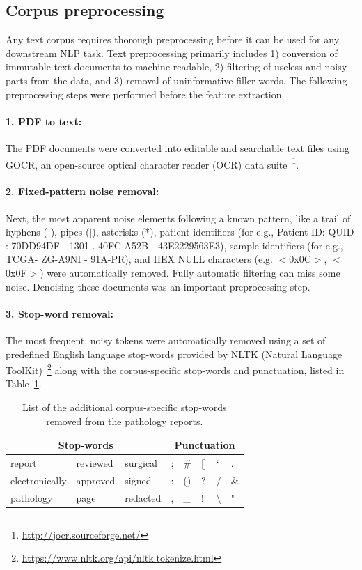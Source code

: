 \documentclass[runningheads]{llncs}
\begin{document}
\subsection{Corpus preprocessing}
\label{subsec:preproc}
%
Any text corpus requires thorough preprocessing before it can be used for any downstream NLP task. 
Text preprocessing primarily includes 1) conversion of immutable text documents to machine readable, 2) filtering of useless and noisy parts from the data, and 3) removal of uninformative filler words.
The following preprocessing steps were performed before the feature extraction.
%
\paragraph{1. PDF to text: } The PDF documents were converted into editable and searchable text files using GOCR, an open-source optical character reader (OCR) data suite~\footnote{\url{http://jocr.sourceforge.net/}}.
%
\paragraph{2. Fixed-pattern noise removal: } Next, the most apparent noise elements following a known pattern, like a trail of hyphens (-), pipes ($\vert$), asterisks (*), patient identifiers (for e.g., Patient ID: QUID : 70DD94DF - 1301 . 40FC-A52B - 43E2229563E3), sample identifiers (for e.g., TCGA- ZG-A9NI - 91A-PR), and HEX NULL characters (e.g. $<$0x0C$>$, $<$0x0F$>$) were automatically removed.
Fully automatic filtering can miss some noise.
Denoising these documents was an important preprocessing step.
%
\paragraph{3. Stop-word removal: } The most frequent, noisy tokens were automatically removed using a set of predefined English language stop-words provided by NLTK (Natural Language ToolKit)~\footnote{\url{https://www.nltk.org/api/nltk.tokenize.html}} along with the corpus-specific stop-words and punctuation, listed in Table~\ref{tab:stopwords}.
%
\begin{table}[]
    \centering
        \caption{List of the additional corpus-specific stop-words removed from the pathology reports.}
        \begin{tabular}{ |p{2cm}|p{2cm}|p{2cm}||p{0.8cm}|p{0.8cm}|p{0.8cm}|p{0.8cm}|p{0.8cm}| } 
         \hline
         \multicolumn{3}{|c||}{Stop-words} & \multicolumn{5}{|c|}{Punctuation}  \\
         \hline
         report & reviewed & surgical & ; & \# & [] & ` & . \\
         \hline
         electronically & approved & signed & : & () & ? & / & \& \\ 
         \hline
         pathology & page & redacted & , & \_  & ! & \textbackslash & " \\ 
         \hline
        \end{tabular}
    \vspace{1mm}
    \label{tab:stopwords}
\end{table}
%
\end{document}
